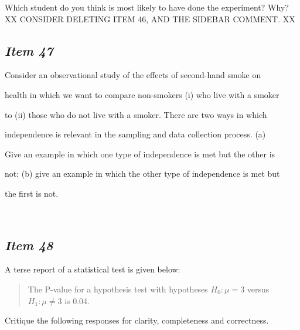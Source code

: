 Which student do you think is most likely to have done the experiment? Why? 
XX CONSIDER DELETING ITEM 46, AND THE SIDEBAR COMMENT. XX





\subsection{\textbf{\textit{Item 47}}}





Consider an observational study of the effects of second-hand smoke on


health in which we want to compare non-smokers (i) who live with a smoker


to (ii) those who do not live with a smoker. There are two ways in which


independence is relevant in the sampling and data collection process. (a)


Give an example in which one type of independence is met but the other is


not; (b) give an example in which the other type of independence is met but


the first is not.





\ 





\subsection{\textbf{\textit{Item 48}}}





A terse report of a statistical test is given below:


\begin{quote}


The P-value for a hypothesis test with hypotheses $H_0: \mu = 3$ versus $H_1: \mu \neq 3$ is 0.04.


\end{quote}





Critique the following responses for clarity, completeness and correctness.





